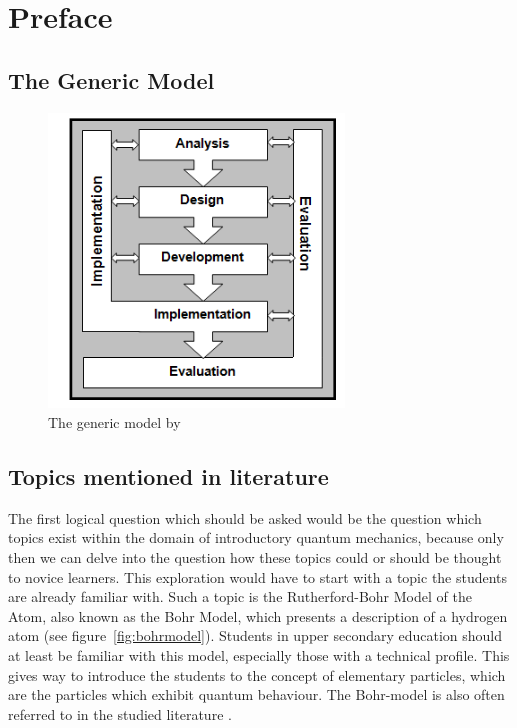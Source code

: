\documentclass[11pt,twoside]{report} %
\begin{document}
\chapter{Preface}


\section{The Generic Model}

\begin{figure}[h]
\centering
\includegraphics[width=0.7\textwidth]{genericmodel}
\caption{The generic model by \protect{}\label{fig:genericmodel}}
\end{figure}

\section{Topics mentioned in literature}
\label{sec:topicsliterature}

The first logical question which should be asked would be the question which topics exist within the domain of introductory quantum mechanics, because only then we can delve into the question how these topics could or should be thought to novice learners. This exploration would have to start with a topic the students are already familiar with. Such a topic is the Rutherford-Bohr Model of the Atom, also known as the Bohr Model, which presents a description of a hydrogen atom (see figure~\ref{fig:bohrmodel}). Students in upper secondary education should at least be familiar with this model, especially those with a technical profile. This gives way to introduce the students to the concept of elementary particles, which are the particles which exhibit quantum behaviour. The Bohr-model is also often referred to in the studied literature \cite{dori, mckagan, muller, papaphotis1, papaphotis2}.
\end{document}
